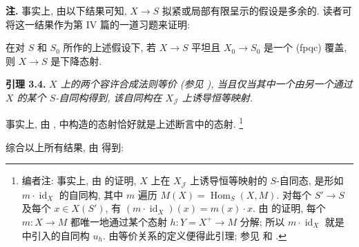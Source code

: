 \medskip
\noindent\textbf{注.}
事实上, 由以下结果可知, \(X\to S\) 拟紧或局部有限呈示的假设是多余的.
读者可将这一结果作为第 IV 篇的一道习题来证明:

在对 \(S\) 和 \(S_0\) 所作的上述假设下,
若 \(X\to S\) 平坦且 \(X_0\to S_0\) 是一个 (fpqc) 覆盖,
则 \(X\to S\) 是下降态射.

\medskip
\noindent{}\textbf{引理 3.4.}
\textit{\(X\) 上的两个容许合成法则等价
(参见 ),
当且仅当其中一个由另一个通过 \(X\) 的某个 \(S\)-自同构得到,
该自同构在 \(X_{\mathscr J}\) 上诱导恒等映射.}

事实上, 由 ,
 中构造的态射恰好就是上述断言中的态射.
\footnote{编者注: 事实上, 由  的证明,
\(X\) 上在 \(X_{\mathscr J}\) 上诱导恒等映射的 \(S\)-自同态,
是形如 \(m\cdot\operatorname{id}_X\) 的自同构,
其中 \(m\) 遍历 \(M(X)=\operatorname{Hom}_S(X,M)\).
对每个 \(S'\to S\) 及每个 \(x\in X(S')\), 有
\((m\cdot\operatorname{id}_X)(x)=m(x)\cdot x\).
由  的证明,
每个 \(m:X\to M\) 都唯一地通过某个态射 \(h:Y=X^+\to M\) 分解;
所以 \(m\cdot\operatorname{id}_X\) 就是
 中引入的自同构 \(u_h\).
由等价关系的定义便得此引理;
参见  和
.}

综合以上所有结果, 由 得到:

